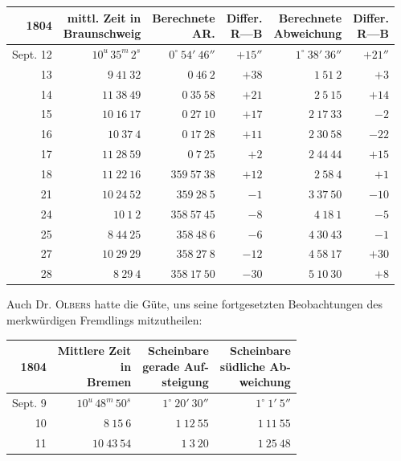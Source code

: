 \begin{center}
\begingroup\fontsize{8}{10}\selectfont\setlength{\tabcolsep}{3pt}\renewcommand{\arraystretch}{1.12}
\begin{tabular}{r|r|r|r|r|r}
1804 & \shortstack{mittl. Zeit in\\Braunschweig} & \shortstack{Berechnete\\AR.} & \shortstack{Differ.\\R—B} & \shortstack{Berechnete\\Abweichung} & \shortstack{Differ.\\R—B} \\ \hline
Sept. 12 & $10^{u}\,35^{m}\,2^{s}$ & $0^\circ\ 54'\ 46''$ & $+15''$ & $1^\circ\ 38'\ 36''$ & $+21''$ \\
13 & $9\ 41\ 32$ & $0\ 46\ 2$ & $+38$ & $1\ 51\ 2$ & $+3$ \\
14 & $11\ 38\ 49$ & $0\ 35\ 58$ & $+21$ & $2\ 5\ 15$ & $+14$ \\
15 & $10\ 16\ 17$ & $0\ 27\ 10$ & $+17$ & $2\ 17\ 33$ & $-2$ \\
16 & $10\ 37\ 4$ & $0\ 17\ 28$ & $+11$ & $2\ 30\ 58$ & $-22$ \\
17 & $11\ 28\ 59$ & $0\ 7\ 25$ & $+2$ & $2\ 44\ 44$ & $+15$ \\
18 & $11\ 22\ 16$ & $359\ 57\ 38$ & $+12$ & $2\ 58\ 4$ & $+1$ \\
21 & $10\ 24\ 52$ & $359\ 28\ 5$ & $-1$ & $3\ 37\ 50$ & $-10$ \\
24 & $10\ 1\ 2$ & $358\ 57\ 45$ & $-8$ & $4\ 18\ 1$ & $-5$ \\
25 & $8\ 44\ 25$ & $358\ 48\ 6$ & $-6$ & $4\ 30\ 43$ & $-1$ \\
27 & $10\ 29\ 29$ & $358\ 27\ 8$ & $-12$ & $4\ 58\ 17$ & $+30$ \\
28 & $8\ 29\ 4$ & $358\ 17\ 50$ & $-30$ & $5\ 10\ 30$ & $+8$ \\
\end{tabular}\endgroup
\end{center}

Auch Dr. \textsc{Olbers} hatte die Güte, uns seine fortgesetzten Beobachtungen des
merkwürdigen Fremdlings mitzutheilen:

\begin{center}
\begingroup\fontsize{9}{11}\selectfont\setlength{\tabcolsep}{3pt}\renewcommand{\arraystretch}{1.12}
\begin{tabular}{r|r|r|r}
1804 & \shortstack{Mittlere Zeit\\in\\Bremen} & \shortstack{Scheinbare\\gerade Auf-\\steigung} & \shortstack{Scheinbare\\südliche Ab-\\weichung} \\ \hline
Sept. 9 & $10^{u}\,48^{m}\,50^{s}$ & $1^\circ\ 20'\ 30''$ & $1^\circ\ 1'\ 5''$ \\
10 & $8\ 15\ 6$ & $1\ 12\ 55$ & $1\ 11\ 55$ \\
11 & $10\ 43\ 54$ & $1\ 3\ 20$ & $1\ 25\ 48$ \\
\end{tabular}\endgroup
\end{center}


